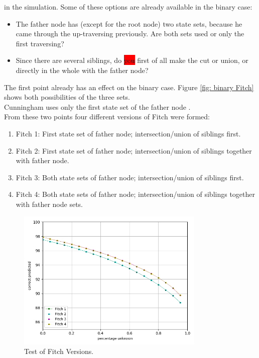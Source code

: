           in the simulation. Some of these options are already available in the binary case:
        \begin{itemize}
          \item The father node has (except for the root node) two state sets, because he came through 
            the up-traversing previously. Are both sets used or only the first traversing?
          \item Since there are several siblings, do \colorbox{red}{you} first of all make the cut or union, 
            or directly in the whole with the father node?
        \end{itemize}
        The first point already has an effect on the binary case. Figure \ref{fig: binary Fitch} shows 
          both possibilities of the three sets. \\
        Cunningham uses only the first state set of the father node \cite{Cunningham1998}. \\
        From these two points four different versions of Fitch were formed:
        \begin{enumerate}
          \item Fitch 1: First state set of father node; intersection/union of siblings first.
          \item Fitch 2: First state set of father node; intersection/union of siblings together with father node.
          \item Fitch 3: Both state sets of father node; intersection/union of siblings first.
          \item Fitch 4: Both state sets of father node; intersection/union of siblings together with father node sets.
        \end{enumerate}
        \begin{figure}
          \centering
          \includegraphics[width=0.8\textwidth]{Figures/simulation_fitch_evaluation.png}
          \caption{Test of Fitch Versions.}
          \label{fig:Fitch versions}
        \end{figure}

